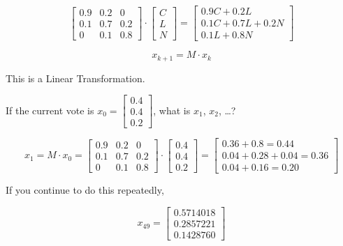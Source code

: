 \documentclass[12pt]{article}
\begin{document}
\begin{equation*}
  \begin{bmatrix}
    0.9 & 0.2 & 0 \\
    0.1 & 0.7 & 0.2 \\
    0 & 0.1 & 0.8
  \end{bmatrix}
  \cdot
  \begin{bmatrix} C \\ L \\ N \end{bmatrix}
  =
  \begin{bmatrix}
    0.9 C + 0.2 L \\
    0.1 C + 0.7 L + 0.2 N \\
    0.1 L + 0.8 N 
  \end{bmatrix}
\end{equation*}

\begin{equation*}
  x_{k+1} = M \cdot x_k
\end{equation*}

This is a Linear Transformation.

If the current vote is $x_0 = \begin{bmatrix} 0.4 \\ 0.4 \\ 0.2 \end{bmatrix}$,
what is $x_1$, $x_2$, \dots?

\begin{equation*}
  x_1 = M \cdot x_0 =
  \begin{bmatrix}
    0.9 & 0.2 & 0 \\
    0.1 & 0.7 & 0.2 \\
    0 & 0.1 & 0.8
  \end{bmatrix}
  \cdot
  \begin{bmatrix} 0.4 \\ 0.4 \\ 0.2 \end{bmatrix}
  =
  \begin{bmatrix}
    0.36 + 0.8 = 0.44 \\
    0.04 + 0.28 + 0.04 = 0.36 \\
    0.04 + 0.16 = 0.20
  \end{bmatrix}
\end{equation*}

If you continue to do this repeatedly,

\begin{equation*}
  x_{49} = 
  \begin{bmatrix}
    0.5714018 \\
    0.2857221 \\
    0.1428760
  \end{bmatrix}
\end{equation*}
\end{document}
